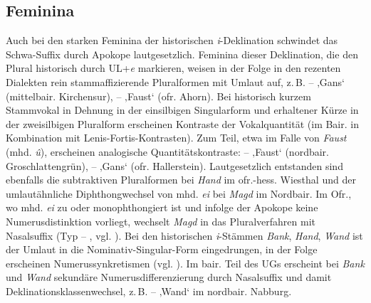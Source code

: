 \subsection{Feminina}\label{sec:8.2.3}
\begin{sloppypar}
Auch bei den starken Feminina der historischen \textit{i}-Deklination schwindet das Schwa-Suffix durch Apokope lautgesetzlich. Feminina dieser Deklination, die den Plural historisch durch UL+\textit{e} markieren, weisen in der Folge in den rezenten Dialekten rein stammaffizierende Pluralformen mit Umlaut auf, z.\,B.  --  ‚Gans‘ (mittelbair. Kirchensur),  --  ‚Faust‘ (ofr. Ahorn). Bei historisch kurzem Stammvokal in Dehnung in der einsilbigen Singularform und erhaltener Kürze in der zweisilbigen Pluralform erscheinen Kontraste der Vokalquantität (im Bair. in Kombination mit Lenis-Fortis-Kontrasten). Zum Teil, etwa im Falle von \textit{Faust} (mhd. \textit{û}), erscheinen analogische Quantitätskontraste:  --  ‚Faust‘ (nordbair. Groschlattengrün),  --  ‚Gans‘ (ofr. Hallerstein). Lautgesetzlich entstanden sind ebenfalls die subtraktiven Pluralformen bei \textit{Hand} im ofr.-hess. Wiesthal und der umlautähnliche Diph\-thong\-wech\-sel von mhd. \textit{ei} bei \textit{Magd} im Nordbair. Im Ofr., wo mhd. \textit{ei} zu  oder  monophthongiert ist und infolge der Apokope keine Numerusdistinktion vorliegt, wechselt \textit{Magd} in das Pluralverfahren mit Nasalsuffix (Typ  -- , vgl. ). Bei den historischen \textit{i}{}-Stämmen \textit{Bank}, \textit{Hand}, \textit{Wand} ist der Umlaut in die Nominativ-Singular-Form eingedrungen, in der Folge erscheinen Numerussynkretismen (vgl. ). Im bair. Teil des UGs erscheint bei \textit{Bank} und \textit{Wand} sekundäre Numerusdifferenzierung durch Nasalsuffix und damit Deklinationsklassenwechsel, z.\,B.  --   ‚Wand‘ im nordbair. Nabburg.
\end{sloppypar}

